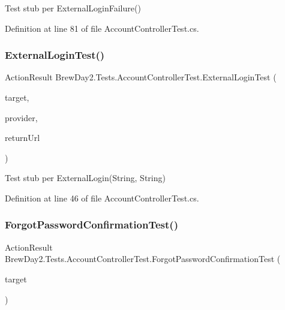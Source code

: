Test stub per External\+Login\+Failure()



Definition at line 81 of file Account\+Controller\+Test.\+cs.

\mbox{\label{class_brew_day2_1_1_tests_1_1_account_controller_test_a732497850168a7e099f6a11074c051ed}} 
\subsubsection{\texorpdfstring{External\+Login\+Test()}{ExternalLoginTest()}}
{\footnotesize\ttfamily Action\+Result Brew\+Day2.\+Tests.\+Account\+Controller\+Test.\+External\+Login\+Test (\begin{DoxyParamCaption}\item[{\mbox{[}\+Pex\+Assume\+Under\+Test\mbox{]} \mbox{\hyperlink{class_brew_day2_1_1_controllers_1_1_account_controller}{Account\+Controller}}}]{target,  }\item[{string}]{provider,  }\item[{string}]{return\+Url }\end{DoxyParamCaption})}



Test stub per External\+Login(\+String, String)



Definition at line 46 of file Account\+Controller\+Test.\+cs.

\mbox{\label{class_brew_day2_1_1_tests_1_1_account_controller_test_ad0d4e3379fe8981cd560ca7c0505a88f}} 
\subsubsection{\texorpdfstring{Forgot\+Password\+Confirmation\+Test()}{ForgotPasswordConfirmationTest()}}
{\footnotesize\ttfamily Action\+Result Brew\+Day2.\+Tests.\+Account\+Controller\+Test.\+Forgot\+Password\+Confirmation\+Test (\begin{DoxyParamCaption}\item[{\mbox{[}\+Pex\+Assume\+Under\+Test\mbox{]} \mbox{\hyperlink{class_brew_day2_1_1_controllers_1_1_account_controller}{Account\+Controller}}}]{target }\end{DoxyParamCaption})}



